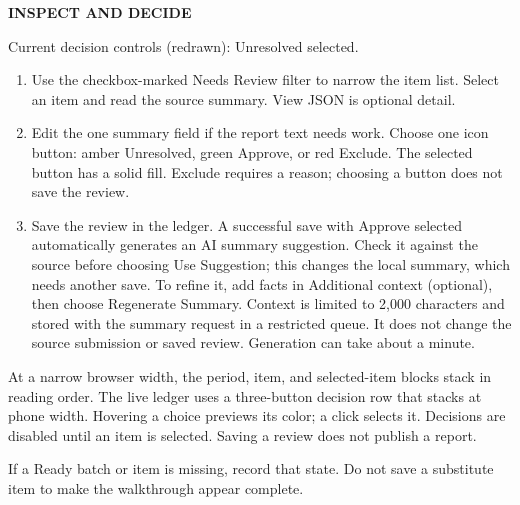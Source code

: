 \documentclass[letterpaper,10pt]{article}
\newcommand{\eyebrow}[1]{{\color{Green}\small\bfseries #1}\par\vspace{2pt}}
\newcommand{\pendingicon}{\tikz[baseline=-.5ex,scale=.16]{\draw[line width=.7pt] (0,0) circle(.5);\draw[line width=.7pt] (0,.35)--(0,0)--(.3,0);}}
\begin{document}
\vspace{11pt}
\eyebrow{INSPECT AND DECIDE}
\par
{\color{Muted}\scriptsize Current decision controls (redrawn): Unresolved selected.}\par
\begin{enumerate}[leftmargin=20pt,itemsep=5pt]
\item Use the checkbox-marked Needs Review filter to narrow the item list. Select an item and read the source summary. View JSON is optional detail.
\item Edit the one summary field if the report text needs work. Choose one icon button: amber Unresolved, green Approve, or red Exclude. The selected button has a solid fill. Exclude requires a reason; choosing a button does not save the review.
\item Save the review in the ledger. A successful save with Approve selected automatically generates an AI summary suggestion. Check it against the source before choosing Use Suggestion; this changes the local summary, which needs another save. To refine it, add facts in Additional context (optional), then choose Regenerate Summary. Context is limited to 2,000 characters and stored with the summary request in a restricted queue. It does not change the source submission or saved review. Generation can take about a minute.
\end{enumerate}

\begin{note}
At a narrow browser width, the period, item, and selected-item blocks stack in reading order. The live ledger uses a three-button decision row that stacks at phone width. Hovering a choice previews its color; a click selects it. Decisions are disabled until an item is selected. Saving a review does not publish a report.
\end{note}

\vspace{8pt}
If a Ready batch or item is missing, record that state. Do not save a substitute item to make the walkthrough appear complete.
\newpage
\end{document}
